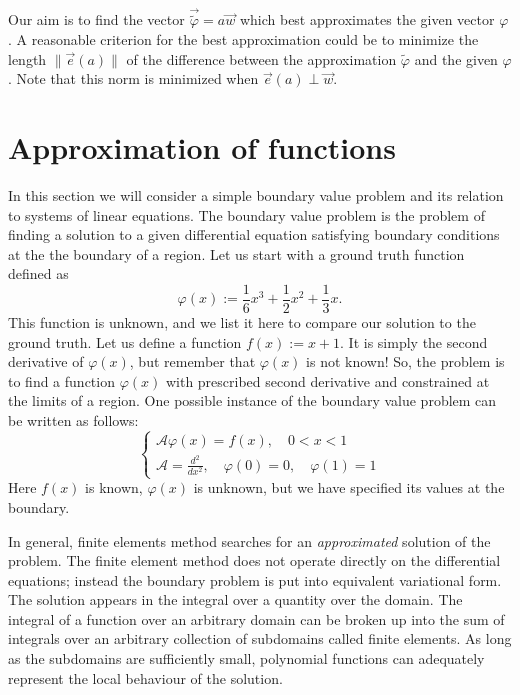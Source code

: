 \documentclass[notitlepage,oneside]{book}
\begin{document}
Our aim is to find the vector $\vec{\tilde{\varphi}} = a\vec{w}$ which best approximates the given vector $\varphi$.
A reasonable criterion for the best approximation could be to minimize the length $\|\vec{e}(a)\|$ of the difference between the approximation $\tilde\varphi$ and the given $\varphi$.
Note that this norm is minimized when $\vec{e}(a) \perp \vec{w}$.

\section{Approximation of functions}
\label{sec:equadiff}

In this section we will consider a simple boundary value problem and its relation to systems of linear equations.
The boundary value problem is the problem of finding a solution to a given differential equation satisfying boundary conditions at the the boundary of a region.
Let us start with a ground truth function defined as 
$$
\varphi(x) := \frac{1}{6} x^3 + \frac{1}{2} x^2 + \frac{1}{3} x.
$$
This function is unknown, and we list it here to compare our solution to the ground truth.
Let us define a function $f(x) := x+1$.
It is simply the second derivative of $\varphi(x)$, but remember that $\varphi(x)$ is not known!
So, the problem is to find a function $\varphi(x)$ with prescribed second derivative and constrained at the limits of a region.
One possible instance of the boundary value problem can be written as follows:
\begin{equation}
\label{eq:femproblem}
\left\{
\begin{split}
\mathcal A\varphi(x) = f(x), \quad 0 < x < 1\\
\mathcal A=\frac{d^2}{dx^2}, \quad \varphi(0)=0, \quad \varphi(1)=1
\end{split}
\right.
\end{equation}
Here $f(x)$ is known, $\varphi(x)$ is unknown, but we have specified its values at the boundary.

In general, finite elements method searches for an \textit{approximated} solution of the problem.
The finite element method does not operate directly on the differential equations; instead the boundary problem is put into equivalent variational form.
The solution appears in the integral over a quantity over the domain. The integral of a function over an arbitrary domain can be broken up into the sum of integrals over an arbitrary collection 
of subdomains called finite elements. As long as the subdomains are sufficiently small, polynomial functions can adequately represent the local behaviour of the solution.
\end{document}
